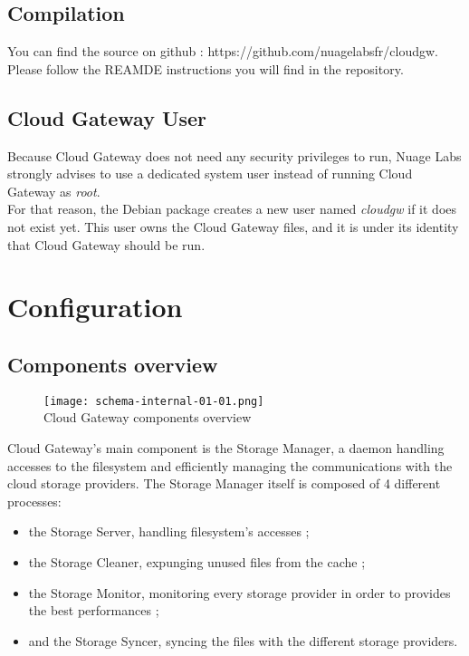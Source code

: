 \documentclass[11pt,fleqn,openany]{book} %
\begin{document}
\section{Compilation}
\label{sec:compilation}

You can find the source on github : https://github.com/nuagelabsfr/cloudgw. Please follow the REAMDE instructions you will find in the repository.

\section{Cloud Gateway User}
\label{sec:cloud-gateway-user}

Because Cloud Gateway does not need any security privileges to run, Nuage Labs strongly advises to use a dedicated
system user instead of running Cloud Gateway as \textit{root}.\\

For that reason, the Debian package creates a new user named \textit{cloudgw} if it does not exist yet.
This user owns the Cloud Gateway files, and it is under its identity that Cloud Gateway should be run.

\cleardoublepage %
\chapter{Configuration}
\label{chap:configuration}

\section{Components overview}
\label{sec:components-overview}

\begin{figure}[H]
\centering
\texttt{[image: schema-internal-01-01.png]}\\
Cloud Gateway components overview
\end{figure}

Cloud Gateway's main component is the Storage Manager, a daemon handling accesses to the filesystem
and efficiently managing the communications with the cloud storage providers. The Storage Manager itself is composed
of 4 different processes:\\
\begin{itemize}
\item the Storage Server, handling filesystem's accesses ;
\item the Storage Cleaner, expunging unused files from the cache ;
\item the Storage Monitor, monitoring every storage provider in order to provides the best performances ;
\item and the Storage Syncer, syncing the files with the different storage providers.\\
\end{itemize}
\end{document}
